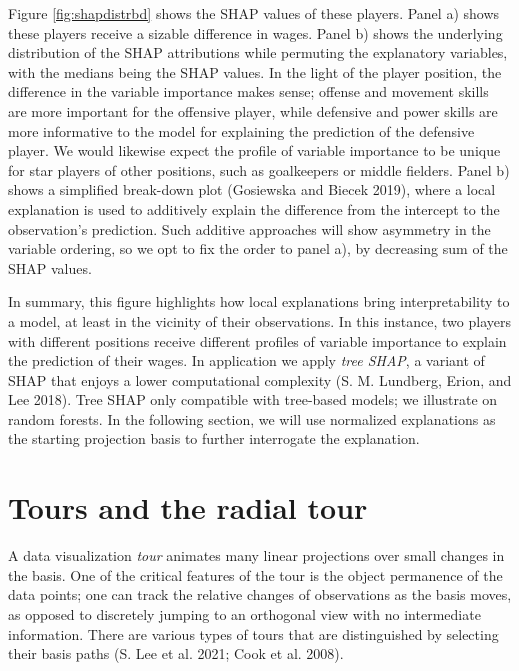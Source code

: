 \documentclass[
  article]{article}
\begin{document}
Figure \ref{fig:shapdistrbd} shows the SHAP values of these players. Panel a) shows these players receive a sizable difference in wages. Panel b) shows the underlying distribution of the SHAP attributions while permuting the explanatory variables, with the medians being the SHAP values. In the light of the player position, the difference in the variable importance makes sense; offense and movement skills are more important for the offensive player, while defensive and power skills are more informative to the model for explaining the prediction of the defensive player. We would likewise expect the profile of variable importance to be unique for star players of other positions, such as goalkeepers or middle fielders. Panel b) shows a simplified break-down plot (Gosiewska and Biecek 2019), where a local explanation is used to additively explain the difference from the intercept to the observation's prediction. Such additive approaches will show asymmetry in the variable ordering, so we opt to fix the order to panel a), by decreasing sum of the SHAP values.

In summary, this figure highlights how local explanations bring interpretability to a model, at least in the vicinity of their observations. In this instance, two players with different positions receive different profiles of variable importance to explain the prediction of their wages. In application we apply \emph{tree SHAP}, a variant of SHAP that enjoys a lower computational complexity (S. M. Lundberg, Erion, and Lee 2018). Tree SHAP only compatible with tree-based models; we illustrate on random forests. In the following section, we will use normalized explanations as the starting projection basis to further interrogate the explanation.

\hypertarget{tours-and-the-radial-tour}{%
\section{Tours and the radial tour}\label{tours-and-the-radial-tour}}

A data visualization \emph{tour} animates many linear projections over small changes in the basis. One of the critical features of the tour is the object permanence of the data points; one can track the relative changes of observations as the basis moves, as opposed to discretely jumping to an orthogonal view with no intermediate information. There are various types of tours that are distinguished by selecting their basis paths (S. Lee et al. 2021; Cook et al. 2008).
\end{document}
